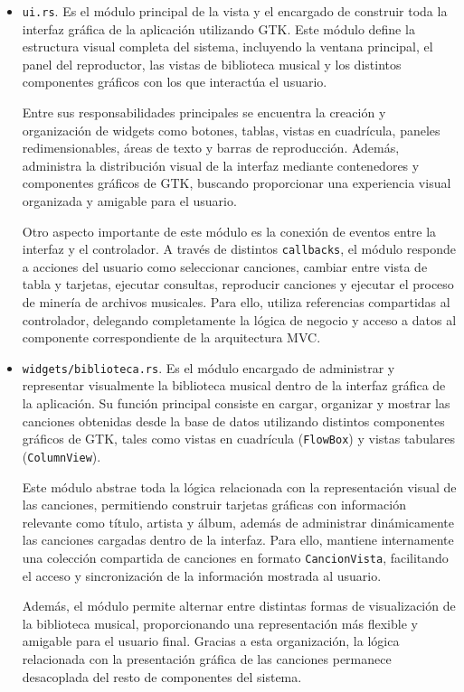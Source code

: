 \documentclass[12pt]{article}
\begin{document}
\begin{itemize}

\item \texttt{ui.rs}. Es el módulo principal de la vista y el encargado de construir toda la interfaz gráfica de la aplicación utilizando GTK. Este módulo define la estructura visual completa del sistema, incluyendo la ventana principal, el panel del reproductor, las vistas de biblioteca musical y los distintos componentes gráficos con los que interactúa el usuario.

Entre sus responsabilidades principales se encuentra la creación y organización de widgets como botones, tablas, vistas en cuadrícula, paneles redimensionables, áreas de texto y barras de reproducción. Además, administra la distribución visual de la interfaz mediante contenedores y componentes gráficos de GTK, buscando proporcionar una experiencia visual organizada y amigable para el usuario.

Otro aspecto importante de este módulo es la conexión de eventos entre la interfaz y el controlador. A través de distintos \texttt{callbacks}, el módulo responde a acciones del usuario como seleccionar canciones, cambiar entre vista de tabla y tarjetas, ejecutar consultas, reproducir canciones y ejecutar el proceso de minería de archivos musicales. Para ello, utiliza referencias compartidas al controlador, delegando completamente la lógica de negocio y acceso a datos al componente correspondiente de la arquitectura MVC.

\item \texttt{widgets/biblioteca.rs}. Es el módulo encargado de administrar y representar visualmente la biblioteca musical dentro de la interfaz gráfica de la aplicación. Su función principal consiste en cargar, organizar y mostrar las canciones obtenidas desde la base de datos utilizando distintos componentes gráficos de GTK, tales como vistas en cuadrícula (\texttt{FlowBox}) y vistas tabulares (\texttt{ColumnView}).

Este módulo abstrae toda la lógica relacionada con la representación visual de las canciones, permitiendo construir tarjetas gráficas con información relevante como título, artista y álbum, además de administrar dinámicamente las canciones cargadas dentro de la interfaz. Para ello, mantiene internamente una colección compartida de canciones en formato \texttt{CancionVista}, facilitando el acceso y sincronización de la información mostrada al usuario.

Además, el módulo permite alternar entre distintas formas de visualización de la biblioteca musical, proporcionando una representación más flexible y amigable para el usuario final. Gracias a esta organización, la lógica relacionada con la presentación gráfica de las canciones permanece desacoplada del resto de componentes del sistema.


\end{itemize}
\end{document}
